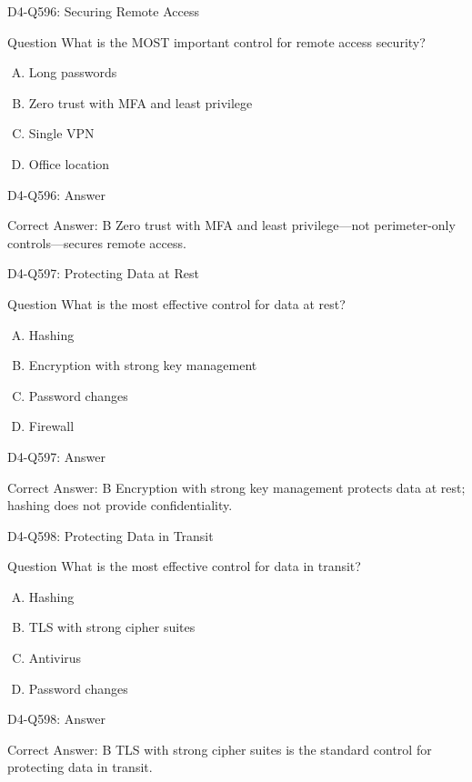 \documentclass{beamer}
\begin{document}
	\begin{frame}{D4-Q596: Securing Remote Access}
		\begin{block}{Question}
			What is the MOST important control for remote access security?
		\end{block}
		\begin{enumerate}[(A)]
			\item Long passwords
			\item Zero trust with MFA and least privilege
			\item Single VPN
			\item Office location
		\end{enumerate}
	\end{frame}
	\begin{frame}{D4-Q596: Answer}
		\begin{block}{Correct Answer: B}
			Zero trust with MFA and least privilege—not perimeter-only controls—secures remote access.
		\end{block}
	\end{frame}
	
	\begin{frame}{D4-Q597: Protecting Data at Rest}
		\begin{block}{Question}
			What is the most effective control for data at rest?
		\end{block}
		\begin{enumerate}[(A)]
			\item Hashing
			\item Encryption with strong key management
			\item Password changes
			\item Firewall
		\end{enumerate}
	\end{frame}
	\begin{frame}{D4-Q597: Answer}
		\begin{block}{Correct Answer: B}
			Encryption with strong key management protects data at rest; hashing does not provide confidentiality.
		\end{block}
	\end{frame}
	
	\begin{frame}{D4-Q598: Protecting Data in Transit}
		\begin{block}{Question}
			What is the most effective control for data in transit?
		\end{block}
		\begin{enumerate}[(A)]
			\item Hashing
			\item TLS with strong cipher suites
			\item Antivirus
			\item Password changes
		\end{enumerate}
	\end{frame}
	\begin{frame}{D4-Q598: Answer}
		\begin{block}{Correct Answer: B}
			TLS with strong cipher suites is the standard control for protecting data in transit.
		\end{block}
	\end{frame}
	
\end{document}
